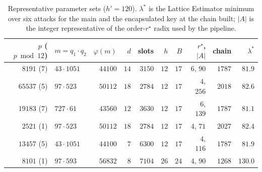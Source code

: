 \begin{table}[t]\centering\caption{Representative parameter sets ($h'=120$). $\lambda^\ast$ is the Lattice Estimator minimum over six attacks for the main and the encapsulated key at the chain \HElib{} built; $|A|$ is the integer representative of the order-$r^\star$ radix used by the pipeline.}\label{tab:params}\renewcommand{\arraystretch}{1.08}\setlength{\tabcolsep}{4pt}\footnotesize
\begin{tabular}{@{}rlrrrrrrrr@{}}\toprule
$p$ ($p\bmod12$) & $m=q_1\cdot q_2$ & $\varphi(m)$ & $d$ & slots & $h$ & $B$ & $r^\star$, $|A|$ & chain & $\lambda^\ast$\\\midrule
$8191$ (7) & $43\cdot1051$ & $44100$ & $14$ & $3150$ & $12$ & $17$ & $6$, $90$ & $1787$ & $81.9$\\
$65537$ (5) & $97\cdot523$ & $50112$ & $18$ & $2784$ & $12$ & $17$ & $4$, $256$ & $2018$ & $82.6$\\
$19183$ (7) & $727\cdot61$ & $43560$ & $12$ & $3630$ & $12$ & $17$ & $6$, $139$ & $1787$ & $81.1$\\
$2521$ (1) & $97\cdot523$ & $50112$ & $18$ & $2784$ & $12$ & $17$ & $4$, $71$ & $2027$ & $82.4$\\
$13457$ (5) & $43\cdot1051$ & $44100$ & $7$ & $6300$ & $12$ & $17$ & $4$, $116$ & $1787$ & $81.9$\\
$8101$ (1) & $97\cdot593$ & $56832$ & $8$ & $7104$ & $26$ & $24$ & $4$, $90$ & $1268$ & $130.0$\\
\bottomrule\end{tabular}\end{table}
